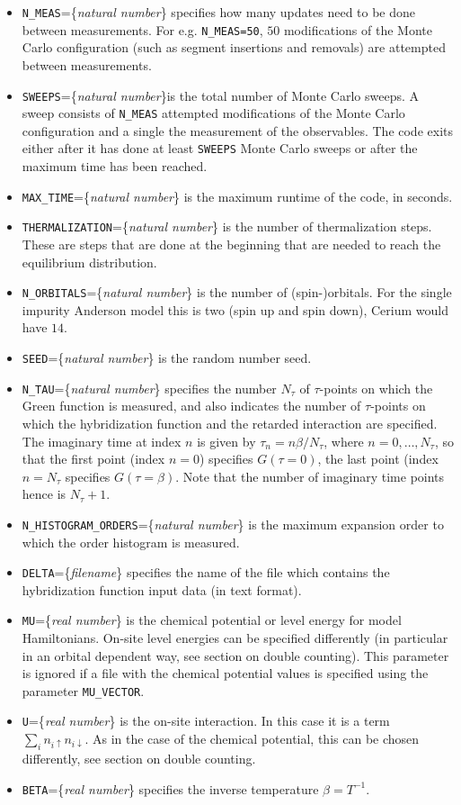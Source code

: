 \documentclass[aps,prb,floatfix,superscriptaddress,twocolumn,notitlepage]{revtex4-1}
\begin{document}
\begin{itemize}
\item \verb#N_MEAS#=\{\emph{natural number}\} specifies how many updates need to be done between measurements. For e.g. \verb#N_MEAS=50#, $50$ modifications of the Monte Carlo configuration (such as segment insertions and removals) are attempted between measurements.
\item \verb#SWEEPS#=\{\emph{natural number}\}is the total number of Monte Carlo sweeps. A sweep consists of \verb#N_MEAS# attempted modifications of the Monte Carlo configuration and a single the measurement of the observables. The code exits either after it has done at least \verb#SWEEPS# Monte Carlo sweeps or after the maximum time has been reached.
\item \verb#MAX_TIME#=\{\emph{natural number}\} is the maximum runtime of the code, in seconds.
\item \verb#THERMALIZATION#=\{\emph{natural number}\} is the number of thermalization steps. These are steps that are done at the beginning that are needed to reach the equilibrium distribution.
\item \verb#N_ORBITALS#=\{\emph{natural number}\} is the number of (spin-)orbitals. For the single impurity Anderson model this is two (spin up and spin down), Cerium would have $14$.
\item \verb#SEED#=\{\emph{natural number}\} is the random number seed. 
\item \verb#N_TAU#=\{\emph{natural number}\} specifies the number $N_{\tau}$ of $\tau$-points on which the Green function is measured, and also indicates the number of $\tau$-points on which the hybridization function and the retarded interaction are specified. The imaginary time at index $n$ is given by $\tau_{n}=n\beta/N_{\tau}$, where $n=0,\ldots,N_{\tau}$, so that the first point (index $n=0$) specifies $G(\tau=0)$, the last point (index $n=N_{\tau}$ specifies $G(\tau=\beta)$. Note that the number of imaginary time points hence is $N_{\tau}+1$.
\item \verb#N_HISTOGRAM_ORDERS#=\{\emph{natural number}\} is the maximum expansion order to which the order histogram is measured. 
\item \verb#DELTA#=\{\emph{filename}\} specifies the name of the file which contains the hybridization function input data (in text format).
\item \verb#MU#=\{\emph{real number}\} is the chemical potential or level energy for model Hamiltonians. On-site level energies can be specified differently (in particular in an orbital dependent way, see section on double counting). This parameter is ignored if a file with the chemical potential values is specified using the parameter \verb#MU_VECTOR#.
\item \verb#U#=\{\emph{real number}\} is the on-site interaction. In this case it is a term $\sum_i n_{i\uparrow}n_{i\downarrow}$. As in the case of the chemical potential, this can be chosen differently, see section on double counting.
\item \verb#BETA#=\{\emph{real number}\} specifies the inverse temperature $\beta=T^{-1}$.
\end{itemize}
\end{document}
